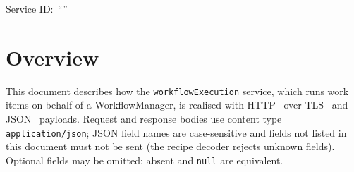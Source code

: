 \documentclass[a4paper]{arrowhead}
\begin{document}
\ArrowheadSetup

\begin{center}
  \vspace*{1cm}
  \huge{\arrowtitle}

  \vspace*{0.2cm}
  \LARGE{\arrowtype}
  \vspace*{1cm}

  \Large{Service ID: \textit{``\arrowid''}}
  \vspace*{\fill}

  

  \vspace*{1cm}
  \vspace*{\fill}

  \begin{abstract}
    This document describes the HTTP/TLS/JSON interface of the \texttt{workflowExecution} service of the Eclipse Arrowhead workflow support systems, service version 1.0.0, documentation edition 5.4.0. It realises the abstract operations of the \texttt{workflowExecution} SD.
  \end{abstract}

  \vspace*{1cm}
\end{center}

\newpage

\tableofcontents
\newpage

\section{Overview}
\label{sec:overview}
This document describes how the \texttt{workflowExecution} service, which runs work items on behalf of a WorkflowManager, is realised with HTTP~\cite{rfc9110}
over TLS~\cite{rfc8446} and JSON~\cite{rfc8259} payloads. Request and response bodies use content type
\texttt{application/json}; JSON field names are case-sensitive and fields not listed in this document must not be sent
(the recipe decoder rejects unknown fields). Optional fields may be omitted; absent and \texttt{null} are equivalent.
\end{document}
